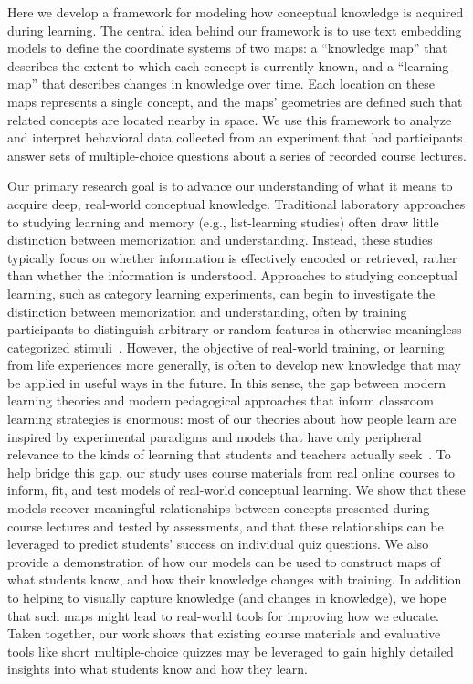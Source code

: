\documentclass[10pt]{article}
\begin{document}
Here we develop a framework for modeling how conceptual knowledge is acquired
during learning. The central idea behind our framework is to use text embedding
models to define the coordinate systems of two maps: a ``knowledge
map'' that describes the extent to which each concept is currently known, and
a ``learning map'' that describes changes in knowledge over time. Each
location on these maps represents a single concept, and the maps' geometries
are defined such that related concepts are located nearby in space. We use this
framework to analyze and interpret behavioral data collected from an experiment
that had participants answer sets of multiple-choice questions about a series of
recorded course lectures.

Our primary research goal is to advance our understanding of what it means to
acquire deep, real-world conceptual knowledge. Traditional laboratory
approaches to studying learning and memory (e.g., list-learning studies) often
draw little distinction between memorization and understanding. Instead, these
studies typically focus on whether information is effectively encoded or
retrieved, rather than whether the information is understood.
Approaches to studying conceptual learning, such as category learning
experiments, can begin to investigate the distinction between memorization and
understanding, often by training participants to distinguish arbitrary or
random features in otherwise meaningless categorized stimuli~\citep{ReilEtal82,
Este86a, Este86b, GlucEtal02, AshbMadd05, HulbNorm15}. However, the objective of
real-world training, or learning from life experiences more generally, is often
to develop new knowledge that may be applied in useful ways in the
future. In this sense, the gap between modern learning theories and modern
pedagogical approaches that inform classroom learning strategies is enormous:
most of our theories about how people learn are inspired by
experimental paradigms and models that have only peripheral relevance to the
kinds of learning that students and teachers actually seek~\citep{Macl05,
HallGree08}. To help bridge this gap, our study uses course materials from real
online courses to inform, fit, and test models of real-world conceptual
learning. We show that these models recover meaningful relationships between
concepts presented during course lectures and tested by assessments, and that
these relationships can be leveraged to predict students' success on individual
quiz questions. We also provide a demonstration of how our models can be used to
construct maps of what students know, and how their knowledge changes with
training. In addition to helping to visually capture knowledge (and changes in
knowledge), we hope that such maps might lead to real-world tools for improving
how we educate. Taken together, our work shows that existing course materials
and evaluative tools like short multiple-choice quizzes may be leveraged to
gain highly detailed insights into what students know and how they learn.
\end{document}
